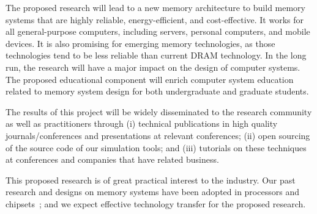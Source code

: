 \documentclass[11pt]{article}
\begin{document}
The proposed research will lead to a new memory architecture to build memory
systems that are highly reliable, energy-efficient, and cost-effective.  It
works for all general-purpose computers, including servers, personal computers,
and mobile devices.  It is also promising for emerging memory technologies, as
those technologies tend to be less reliable than current DRAM technology.  In
the long run, the research will have a major impact on the design of computer
systems.  The proposed educational component will enrich computer system
education related to memory system design for both undergraduate and graduate
students.

The results of this project will be widely disseminated to the research
community as well as practitioners through (i) technical publications in high
quality journals/conferences and presentations at relevant conferences; (ii)
open sourcing of the source code of our simulation tools; and (iii) tutorials on
these techniques at conferences and companies that have related business.

This proposed research is of great practical interest to the industry.  Our past
research and designs on memory systems have been adopted in processors and
chipsets~\cite{zhang:micro00}; and we expect effective technology transfer for
the proposed research.

\newpage \renewcommand{\thepage} {\arabic{page}} \setcounter{page}{1}

\let\oldthebibliography\thebibliography
\renewcommand{\thebibliography}[1]{%
  \oldthebibliography{#1}%
  \setlength{\itemsep}{1.5ex} %
  \setstretch{1.3} %
}

\begingroup
{} %




\endgroup
\end{document}
